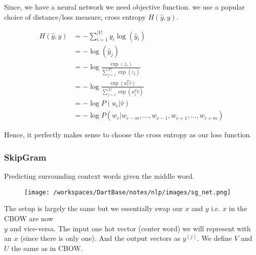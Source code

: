 \documentclass[12pt]{article}
\begin{document}
            Since, we have a neural network we need objective function.
            we use a popular choice of distance/loss
            measure, cross entropy $H(\hat{y}, y)$.

            \begin{align*}
                H(\hat{y}, y) &= -\sum_{i=1}^{|V|} y_i \log(\hat{y}_i) \\
                &= -\log(\hat{y}_j)\\
                &= - \log \frac{\exp(z_c)}{\sum_{j=1}^{|V|} \exp(z_j)} \\
                &= - \log \frac{\exp(u_c^T \hat{v})}{\sum_{j=1}^{|V|} \exp(u_j^T \hat{v})} \\
                &= - \log P(u_c|\hat{v}) \\
                &= - \log P(w_c|w_{c-m}, \ldots, w_{c-1}, w_{c+1}, \ldots, w_{c+m})
            \end{align*}
            
            Hence, it perfectly makes sense to choose the cross entropy as our loss function.
        
        \subsubsection{SkipGram}
            Predicting surrounding context words given the middle word.\\
            \begin{figure}[h]
                \centering
                \texttt{[image: /workspaces/DartBase/notes/nlp/images/sg\_net.png]}
            \end{figure}
            
            The setup is largely the same but we essentially swap our $x$ and $y$ i.e. $x$ in the CBOW are now \\ $y$ and vice-versa. 
            The input one hot vector (center word) we will represent with an $x$ (since there is only one). 
            And the output vectors as $y^{(j)}$. We define $V$ and $U$ the same as in CBOW.
\end{document}
